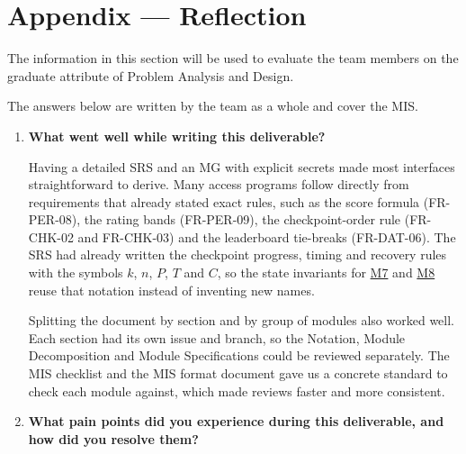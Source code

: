 \documentclass[12pt, titlepage]{article}
\newcommand{\Mref}[1]{\hyperref[sec:M#1]{M#1}}
\begin{document}
\newpage{}

\section{Appendix --- Reflection}

The information in this section will be used to evaluate the team members on the
graduate attribute of Problem Analysis and Design.



The answers below are written by the team as a whole and cover the MIS.

\begin{enumerate}
  \item \textbf{What went well while writing this deliverable?}

  Having a detailed SRS and an MG with explicit secrets made most interfaces
  straightforward to derive. Many access programs follow directly from
  requirements that already stated exact rules, such as the score formula
  (FR-PER-08), the rating bands (FR-PER-09), the checkpoint-order rule
  (FR-CHK-02 and FR-CHK-03) and the leaderboard tie-breaks (FR-DAT-06). The SRS
  had already written the checkpoint progress, timing and recovery rules with
  the symbols $k$, $n$, $P$, $T$ and $C$, so the state invariants for
  \Mref{7} and \Mref{8} reuse that notation instead of inventing new names.

  Splitting the document by section and by group of modules also worked well.
  Each section had its own issue and branch, so the Notation, Module
  Decomposition and Module Specifications could be reviewed separately. The MIS
  checklist and the MIS format document gave us a concrete standard to check
  each module against, which made reviews faster and more consistent.

  \item \textbf{What pain points did you experience during this deliverable,
    and how did you resolve them?}


\end{enumerate}
\end{document}
